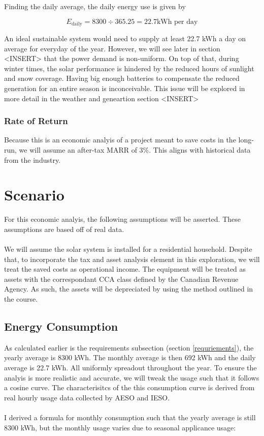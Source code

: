 \documentclass[10pt,letterpaper]{article}
\begin{document}
Finding the daily average, the daily energy use is given by

$$
E_\text{daily}=8300\div 365.25 = 22.7\text{kWh per day}
$$

An ideal sustainable system would need to supply at least 22.7 kWh a day on average for everyday of the year. However, we will see later in section <INSERT> that the power demand is non-uniform. On top of that, during winter times, the solar performance is hindered by the reduced hours of sunlight and snow coverage. Having big enough batteries to compensate the reduced generation for an entire season is inconceivable. This issue will be explored in more detail in the weather and geneartion section <INSERT>\\

\subsubsection{Rate of Return}

Because this is an economic analyis of a project meant to save costs in the long-run, we will assume an after-tax MARR of 3\%. This aligns with historical data from the industry.\\

\section{Scenario}

For this economic analyis, the following assumptions will be asserted. These assumptions are based off of real data.\\
\\
We will assume the solar system is installed for a residential household. Despite that, to incorporate the tax and asset analysis element in this exploration, we will treat the saved costs as operational income. The equipment will be treated as assets with the correspondant CCA class defined by the Canadian Revenue Agency\cite{cca}. As such, the assets will be depreciated by using the method outlined in the course.\\

\subsection{Energy Consumption}

As calculated earlier is the requirements subsection (section \ref{requriements}), the yearly average is 8300 kWh. The monthly average is then 692 kWh and  the daily average is 22.7 kWh. All uniformly spreadout throughout the year. To ensure the analyis is more realistic and accurate, we will tweak the usage such that it follows a cosine curve. The characterisitcs of the this consumption curve is derived from real hourly usage data collected by AESO and IESO.\cite{aeso-load-data, ieso-power-data}\\
\\
I derived a formula for monthly consumption such that the yearly average is still 8300 kWh, but the monthly usage varies due to seasonal applicance usage:
\end{document}
